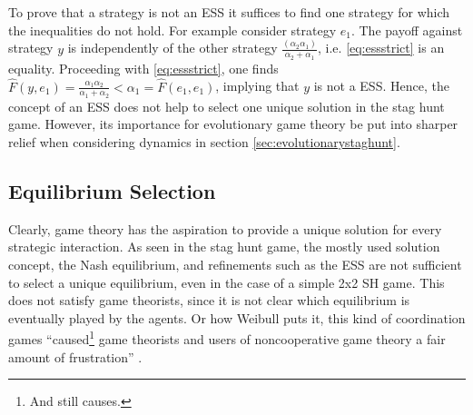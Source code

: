 To prove that a strategy is not an ESS it suffices to find one
strategy for which the inequalities do not hold.
For example consider strategy $e_1$.
The payoff against strategy $y$ is independently of the other strategy 
$\frac{(\alpha_2 \alpha_1)}{\alpha_2+\alpha_1}$, i.e. 
\eqref{eq:essstrict} is an equality.
Proceeding with \eqref{eq:essstrict}, one finds
$\hat{F}(y,e_1) = \frac{\alpha_1 \alpha_2}{\alpha_1+\alpha_2}
< \alpha_1 = \hat{F}(e_1,e_1)$, implying that $y$ is not a ESS.
Hence, the concept of an ESS does not help to select one 
unique solution in the stag hunt game. However, its importance for
evolutionary game theory be put into sharper relief when considering
dynamics in section \ref{sec:evolutionarystaghunt}. 


\subsection{Equilibrium Selection}
\label{sec:equilibriumselection}
Clearly, game theory has the aspiration to provide a unique solution for 
every strategic interaction.
As seen in the stag hunt game, the mostly used solution concept, 
the Nash equilibrium, and refinements such as the ESS are
not sufficient to select a unique equilibrium, even in the case of a simple
2x2 SH game. This does not satisfy game theorists, since it is not clear which
equilibrium is eventually played by the agents. Or how 
Weibull puts it, this kind of coordination games 
``caused\footnote{And still causes.} game theorists and users of 
noncooperative game theory a fair amount of frustration'' 
\parencite[30]{weibull_evolutionary_1997}. 

